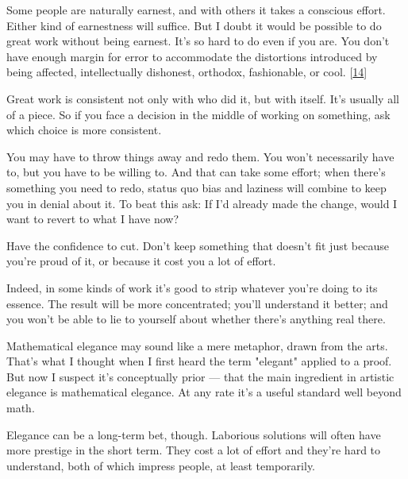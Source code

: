 Some people
                  are naturally earnest, and with others it takes a conscious
                  effort. Either kind of earnestness will suffice. But I doubt
                  it would be possible to do great work without being earnest.
                  It's so hard to do even if you are. You don't have enough
                  margin for error to accommodate the distortions introduced by
                  being affected, intellectually dishonest, orthodox,
                  fashionable, or cool.
                  [\href{\#f14n}{14}]






                  Great work is consistent not only with who did it, but with
                  itself. It's usually all of a piece. So if you face a decision
                  in the middle of working on something, ask which choice is
                  more consistent.

You may have to throw things away
                  and redo them. You won't necessarily have to, but you have to
                  be willing to. And that can take some effort; when there's
                  something you need to redo, status quo bias and laziness will
                  combine to keep you in denial about it. To beat this ask: If
                  I'd already made the change, would I want to revert to what I
                  have now?

Have the confidence to cut. Don't keep
                  something that doesn't fit just because you're proud of it, or
                  because it cost you a lot of effort.

Indeed, in
                  some kinds of work it's good to strip whatever you're doing to
                  its essence. The result will be more concentrated; you'll
                  understand it better; and you won't be able to lie to yourself
                  about whether there's anything real there.

Mathematical
                  elegance may sound like a mere metaphor, drawn from the arts.
                  That's what I thought when I first heard the term "elegant"
                  applied to a proof. But now I suspect it's conceptually prior
                  --- that the main ingredient in artistic elegance is
                  mathematical elegance. At any rate it's a useful standard well
                  beyond math.

Elegance can be a long-term bet,
                  though. Laborious solutions will often have more prestige in
                  the short term. They cost a lot of effort and they're hard to
                  understand, both of which impress people, at least
                  temporarily.


